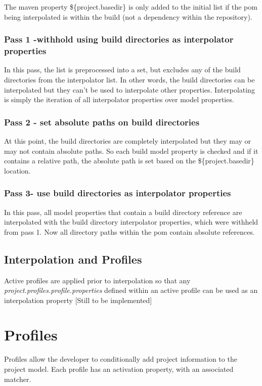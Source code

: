 \documentclass[12pt]{amsart}
\begin{document}
The maven property \$\{project.basedir\} is only added to the initial list if the pom being interpolated is within the build (not a dependency within the repository).

\subsubsection{Pass 1 -withhold using build directories as interpolator properties} In this pass, the list is preprocessed into a set, but excludes  any of the build directories from the interpolator list. In other words, the build directories can be interpolated but they can't be used to interpolate other properties. Interpolating is simply the iteration of all interpolator properties over model properties.

\subsubsection{Pass 2 - set absolute paths on build directories} At this point, the build directories are completely interpolated but they may or may not contain absolute paths. So each build model property is checked and if it contains a relative path, the absolute path is set based on the \$\{project.basedir\} location.

\subsubsection{Pass 3- use build directories as interpolator properties} In this pass, all model properties that contain a build directory reference are interpolated with the build directory interpolator properties, which were withheld from pass 1. Now all directory paths within the pom contain absolute references.

\subsection{Interpolation and Profiles}
Active profiles are applied prior to interpolation so that any \emph{project.profiles.profile.properties} defined within an active profile can be used as an interpolation property [Still to be implemented]

\section{Profiles}
Profiles allow the developer to conditionally add project information to the project model. Each profile has an activation property, with an associated matcher.
\end{document}
